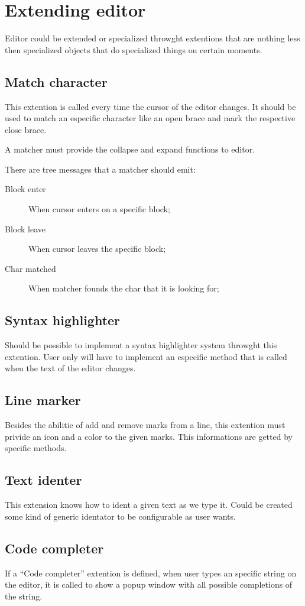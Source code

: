 \documentclass[11pt,a4paper]{report}
\begin{document}
\chapter{Extending editor} \label{extentions}
Editor could be extended or specialized throwght extentions that are nothing less then specialized objects that do specialized things on certain moments.

\section{Match character} \label{matcher}
This extention is called every time the cursor of the editor changes. It should be used to match an especific character like an open brace and mark the respective close brace.

A matcher must provide the collapse and expand functions to editor.

There are tree messages that a matcher should emit:

\begin{description}
\item[Block enter] When cursor enters on a specific block;
\item[Block leave] When cursor leaves the specific block;
\item[Char matched] When matcher founds the char that it is looking for;
\end{description}

\section{Syntax highlighter} \label{highlighter}
Should be possible to implement a syntax highlighter system throwght this extention. User only will have to implement an especific method that is called when the text of the editor changes.

\section{Line marker} \label{marker}
Besides the abilitie of add and remove marks from a line, this extention must privide an icon and a color to the given marks. This informations are getted by specific methods.

\section{Text identer}
This extension knows how to ident a given text as we type it. Could be created some kind of generic identator to be configurable as user wants.

\section{Code completer}
If a ``Code completer'' extention is defined, when user types an specific string on the editor, it is called to show a popup window with all possible completions of the string.
\end{document}
